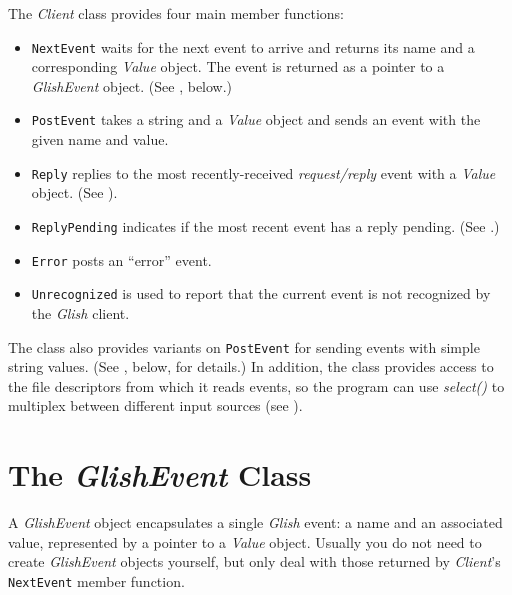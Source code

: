 The {\em Client} class provides four main member functions:
\begin{itemize}

\item {\tt NextEvent}
waits for the next event to arrive and
returns its name and a corresponding {\em Value} object.  The
event is returned as a pointer to a {\em GlishEvent} object. (See
, below.)

\item {\tt PostEvent}
takes a string and a {\em Value} object
and sends an event with the given name and value.

\item {\tt Reply}
\label{client-class_Reply}
replies to the most recently-received {\em request/reply} event 
with a {\em Value} object.  (See ).
\item {\tt ReplyPending}
\label{client-class_ReplyPending}
indicates if the most recent event has a reply pending.
(See .)

\item {\tt Error}
posts an ``error'' event.

\item {\tt Unrecognized}
is used to report that the current event is not
recognized by the {\em Glish} client.

\end{itemize}

The class also provides variants on {\tt PostEvent} for sending events
with simple string values. (See , below, for details.)
In addition, the class provides access to
the file descriptors from which it reads events, so the program can
use {\em select()} to multiplex between different input sources (see
).

\section{The {\em GlishEvent} Class}
\label{glishevent-class}

A {\em GlishEvent} object encapsulates a single {\em Glish} event: a name
and an associated value, represented by a pointer to a {\em Value}
object.  Usually you do not need to create {\em GlishEvent} objects
yourself, but only deal with those returned by {\em Client\/}'s
{\tt NextEvent} member function.

